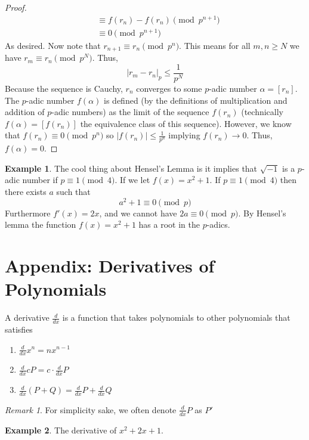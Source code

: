 \documentclass{article}
\newenvironment{definition}[1][Definition:]{\begin{trivlist}
\item[\hskip \labelsep {\bfseries #1}]}{\end{trivlist}}
\theoremstyle{theorem}
\theoremstyle{definition}
\theoremstyle{definition}
\theoremstyle{remark}
\theoremstyle{definition}
\newtheorem{example}{Example}[section]
\theoremstyle{remark}
\newtheorem{remark}{Remark}[subsection]
\begin{document}
\begin{proof}
\begin{align*}
&\equiv f(r_n) - f(r_n) \pmod {p^{n+1}} \\
&\equiv 0 \pmod {p^{n+1}}
\end{align*}
As desired. Now note that $r_{n+1} \equiv r_n \pmod {p^n}$. This means for all $m,n \ge N$ we have $r_m \equiv r_n \pmod{p^N}$. Thus, \[|r_m - r_n|_p \le \frac{1}{p^N}\]
Because the sequence is Cauchy, $r_n$ converges to some $p$-adic number $\alpha = [r_n]$. The $p$-adic number $f(\alpha)$ is defined (by the definitions of multiplication and addition of $p$-adic numbers) as the limit of the sequence $f(r_n)$ (technically $f(\alpha) = [f(r_n)]$ the equivalence class of this sequence). However, we know that $f(r_n) \equiv 0 \pmod{p^n}$ so $|f(r_n)| \le \frac{1}{p^n}$ implying $f(r_n) \to 0$. Thus, $f(\alpha) = 0$. 
\end{proof}
\begin{example} The cool thing about Hensel's Lemma is it implies that $\sqrt{-1}$ is a $p$-adic number if $p \equiv 1 \pmod 4$. If we let $f(x) = x^2 + 1$. If $p \equiv 1 \pmod 4$ then there exists $a$ such that
\[a^2 + 1 \equiv 0 \pmod p\]
Furthermore $f'(x) = 2x$, and we cannot have $2a \equiv 0 \pmod p$. By Hensel's lemma the function $f(x) = x^2 + 1$ has a root in the $p$-adics.
\end{example}

\section{Appendix: Derivatives of Polynomials}

\begin{definition} A derivative $\frac{d}{dx}$ is a function that takes polynomials to other polynomials that satisfies
\begin{enumerate}
\item $\frac{d}{dx} x^n = nx^{n - 1}$
\item $\frac{d}{dx} cP = c \cdot \frac{d}{dx} P$
\item $\frac{d}{dx} (P + Q) = \frac{d}{dx} P + \frac{d}{dx} Q$
\end{enumerate}
\end{definition}
\begin{remark} For simplicity sake, we often denote $\frac{d}{dx} P$ as $P'$
\end{remark}
\begin{example} The derivative of $x^2 + 2x + 1$.
\end{example}
\end{document}
